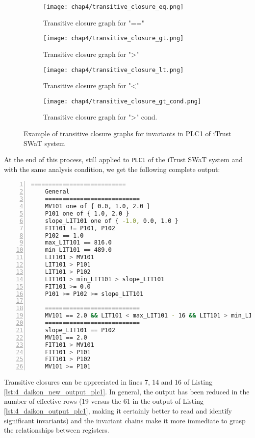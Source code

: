 \begin{figure}[H]
	\centering
	\begin{subfigure}{0.48\textwidth}
		\texttt{[image: chap4/transitive\_closure\_eq.png]}
		\caption{Transitive closure graph for "=="}
		\label{subfig:4_graph_eq}
	\end{subfigure}
	\hfill
	\begin{subfigure}{0.48\textwidth}
		\texttt{[image: chap4/transitive\_closure\_gt.png]}
		\caption{Transitive closure graph for ">"}
		\label{subfig:4_graph_gt}
	\end{subfigure}
	\begin{subfigure}{0.48\textwidth}
		\texttt{[image: chap4/transitive\_closure\_lt.png]}
		\caption{Transitive closure graph for "<"}
		\label{subfig:4_graph_lt}
	\end{subfigure}
	\hfill
	\begin{subfigure}{0.48\textwidth}
		\texttt{[image: chap4/transitive\_closure\_gt\_cond.png]}
		\caption{Transitive closure graph for ">" cond.}
		\label{subfig:4_graph_gt_cond}
	\end{subfigure}
	\caption{Example of transitive closure graphs for invariants in PLC1 of iTrust SWaT system}
	\label{fig:4_transitive_closure_graphs}
\end{figure}
At the end of this process, still applied to \texttt{PLC1} of the iTrust SWaT system and with the same analysis condition, we get the following complete output:

\begin{lstlisting}[language=bash,numbers=left,caption={Revised Daikon output with transitive closures for \texttt{PLC1} of the iTrust SWaT system},label=lst:4_daikon_new_output_plc1]
	===========================
	General
	===========================
	MV101 one of { 0.0, 1.0, 2.0 }
	P101 one of { 1.0, 2.0 }
	slope_LIT101 one of { -1.0, 0.0, 1.0 }
	FIT101 != P101, P102
	P102 == 1.0
	max_LIT101 == 816.0
	min_LIT101 == 489.0
	LIT101 > MV101
	LIT101 > P101
	LIT101 > P102
	LIT101 > min_LIT101 > slope_LIT101
	FIT101 >= 0.0
	P101 >= P102 >= slope_LIT101
	
	===========================
	MV101 == 2.0 && LIT101 < max_LIT101 - 16 && LIT101 > min_LIT101 + 15
	===========================
	slope_LIT101 == P102
	MV101 == 2.0
	FIT101 > MV101
	FIT101 > P101
	FIT101 > P102
	MV101 >= P101
\end{lstlisting}

\noindent Transitive closures can be appreciated in lines 7, 14 and 16 of Listing \ref{lst:4_daikon_new_output_plc1}.\newline
In general, the output has been reduced in the number of effective rows (19 versus the 61 in the output of Listing \ref{lst:4_daikon_output_plc1}, making it certainly better to read and identify significant invariants) and the invariant chains make it more immediate to grasp the relationships between registers.

